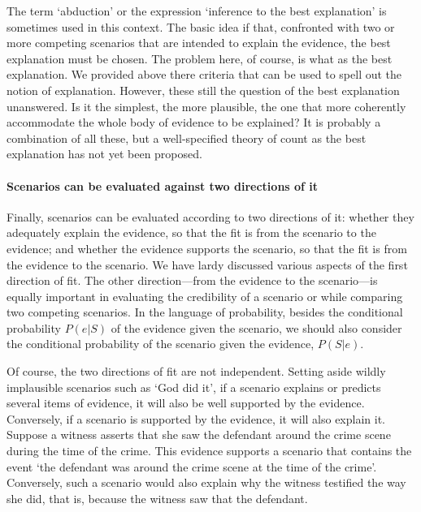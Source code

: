 \documentclass[10pt]{article}
\begin{document}
 The term `abduction' or the expression `inference to the best explanation' is sometimes used in this context. The basic idea if that, confronted 
with two or more competing scenarios that are intended to explain the evidence, the best explanation must be chosen. The problem here, of 
course, is what as the best explanation. We provided above there criteria that can be used to spell out the notion of 
explanation. However, these still the question of the best explanation unanswered. Is it the simplest, the more plausible, 
the one that more coherently accommodate the whole body of evidence to be explained? It is probably a combination of all these, 
but a well-specified theory of count as the best explanation has not yet been proposed.



\paragraph{Scenarios can be evaluated against two directions of it}

Finally, scenarios can be evaluated according to two directions of it: whether they adequately explain the evidence, so that the fit is from 
the scenario to the evidence; and whether the evidence supports the scenario, so that the fit is from the evidence to the scenario.
We have lardy discussed various aspects of the first direction of fit. The other direction---from the evidence to the scenario---is equally important in 
evaluating the credibility of a scenario or while comparing two competing scenarios. 
In the language of probability, besides the conditional probability $P(e|S)$ of the evidence 
given the scenario, we should also consider the conditional probability of the scenario given the evidence, $P(S|e)$.

Of course, the two directions of fit are not  independent. Setting aside wildly implausible 
scenarios such as `God did it', if a scenario explains or predicts several items of evidence, it will also be well supported 
by the evidence. Conversely, if a scenario is supported by the evidence, it will also explain it. Suppose a witness asserts 
that she saw the defendant around the crime scene during the time of the crime. This evidence supports a scenario that contains the event 
`the defendant was around  the crime scene at the time of the crime'. Conversely, such a scenario would also explain why 
the witness testified the way she did, that is, because the witness saw that the defendant. 
\end{document}
